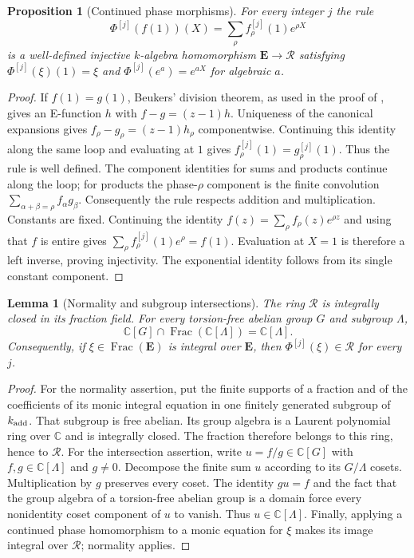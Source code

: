 \documentclass[11pt,a4paper]{article}
\newtheorem{lemma}[theorem]{Lemma}
\newtheorem{proposition}[theorem]{Proposition}
\theoremstyle{definition}\newtheorem{definition}[theorem]{Definition}
\theoremstyle{remark}\newtheorem{remark}[theorem]{Remark}
\begin{document}
\begin{proposition}[Continued phase morphisms]\label{foundation:continued}
For every integer $j$ the rule
\[
 \Phi^{[j]}(f(1))(X)=\sum_\rho f_\rho^{[j]}(1)e^{\rho X}
\]
is a well-defined injective $k$-algebra homomorphism
$\mathbf E\longrightarrow\mathcal R$ satisfying
$\Phi^{[j]}(\xi)(1)=\xi$ and
$\Phi^{[j]}(e^a)=e^{aX}$ for algebraic $a$.
\end{proposition}
\begin{proof}
If $f(1)=g(1)$, Beukers' division theorem, as used in the proof of
\cite[Proposition 3.1]{FR}, gives an E-function $h$ with
$f-g=(z-1)h$.  Uniqueness of the canonical expansions gives
$f_\rho-g_\rho=(z-1)h_\rho$ componentwise.  Continuing this identity
along the same loop and evaluating at $1$ gives
$f_\rho^{[j]}(1)=g_\rho^{[j]}(1)$.  Thus the rule is well defined.
The component identities for sums and products continue along the loop;
for products the phase-$\rho$ component is the finite convolution
$\sum_{\alpha+\beta=\rho}f_\alpha g_\beta$.
Consequently the rule respects addition and multiplication.  Constants
are fixed.  Continuing the identity
$f(z)=\sum_\rho f_\rho(z)e^{\rho z}$ and using that $f$ is entire gives
$\sum_\rho f_\rho^{[j]}(1)e^\rho=f(1)$.  Evaluation at $X=1$ is therefore
a left inverse, proving injectivity.  The exponential identity follows
from its single constant component.
\end{proof}

\begin{lemma}[Normality and subgroup intersections]
\label{foundation:normal}
The ring $\mathcal R$ is integrally closed in its fraction field.
For every torsion-free abelian group $G$ and subgroup $\Lambda$,
\[
 \mathbb C[G]\cap\operatorname{Frac}(\mathbb C[\Lambda])
       =\mathbb C[\Lambda].
\]
Consequently, if $\xi\in\operatorname{Frac}(\mathbf E)$ is integral over
$\mathbf E$, then $\Phi^{[j]}(\xi)\in\mathcal R$ for every $j$.
\end{lemma}
\begin{proof}
For the normality assertion, put the finite supports of a fraction and
of the coefficients of its monic integral equation in one finitely
generated subgroup of $k_{\rm add}$.  That subgroup is free abelian.
Its group algebra is a Laurent polynomial ring over $\mathbb C$ and is
integrally closed.  The fraction therefore belongs to this ring, hence
to $\mathcal R$.
For the intersection assertion, write $u=f/g\in\mathbb C[G]$ with
$f,g\in\mathbb C[\Lambda]$ and $g\ne0$.  Decompose the finite sum $u$
according to its $G/\Lambda$ cosets.  Multiplication by $g$ preserves
every coset.  The identity $gu=f$ and the fact that the group algebra
of a torsion-free abelian group is a domain force every nonidentity
coset component of $u$ to vanish.  Thus $u\in\mathbb C[\Lambda]$.
Finally, applying a continued phase homomorphism to a monic equation
for $\xi$ makes its image integral over $\mathcal R$; normality applies.
\end{proof}
\end{document}
